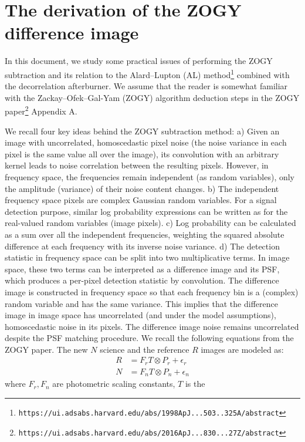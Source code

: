 \documentclass[11pt]{article}
\begin{document}
\section{The derivation of the ZOGY difference image}
%
\par In this document, we study some practical issues of performing the ZOGY
subtraction and its relation to the Alard--Lupton (AL)
method\footnote{\texttt{https://ui.adsabs.harvard.edu/abs/1998ApJ...503..325A/abstract}}
combined with the decorrelation afterburner. We assume that the reader is
somewhat familiar with the Zackay--Ofek--Gal-Yam (ZOGY) algorithm deduction
steps in the ZOGY
paper\footnote{\texttt{https://ui.adsabs.harvard.edu/abs/2016ApJ...830...27Z/abstract}}
Appendix A.
%
\par We recall four key ideas behind the ZOGY subtraction method: a) Given
an image with uncorrelated, homoscedastic pixel noise (the noise variance in
each pixel is the same value all over the image), its convolution with an
arbitrary kernel leads to noise correlation between the resulting
pixels. However, in frequency space, the frequencies remain independent (as
random variables), only the amplitude (variance) of their noise content
changes. b) The independent frequency space pixels are complex Gaussian
random variables. For a signal detection purpose, similar log
probability expressions can be written as for the real-valued random
variables (image pixels). c) Log probability can be calculated as a sum over
all the independent frequencies, weighting the squared absolute difference
at each frequency with its inverse noise variance. d) The detection
statistic in frequency space can be split into two multiplicative terms. In
image space, these two terms can be interpreted as a difference image and
its PSF, which produces a per-pixel detection statistic by convolution. The
difference image is constructed in frequency space so that each frequency
bin is a (complex) random variable and has the same variance. This implies
that the difference image in image space has uncorrelated (and under the
model assumptions), homoscedastic noise in its pixels. The difference image
noise remains uncorrelated despite the PSF matching procedure.
%
We recall the following equations from the ZOGY paper.
The new \(N\) science and the reference \(R\) images are modeled as:
\begin{align}
R &= F_rT\otimes P_r + \epsilon_r\\
N &= F_nT\otimes P_n + \epsilon_n
\label{eq:N}
\end{align}
where \(F_r, F_n\) are photometric scaling constants, \(T\) is the
\end{document}
